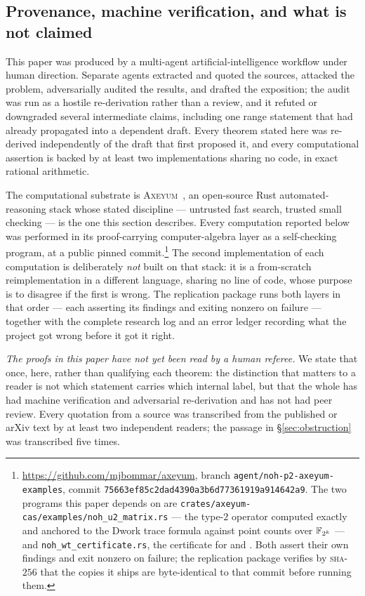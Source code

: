\subsection{Provenance, machine verification, and what is not claimed}
\label{sec:provenance}

This paper was produced by a multi-agent artificial-intelligence workflow
under human direction. Separate agents extracted and quoted the sources,
attacked the problem, adversarially audited the results, and drafted the
exposition; the audit was run as a hostile re-derivation rather than a
review, and it refuted or downgraded several intermediate claims, including
one range statement that had already propagated into a dependent draft. Every
theorem stated here was re-derived independently of the draft that first
proposed it, and every computational assertion is backed by at least two
implementations sharing no code, in exact rational arithmetic.

The computational substrate is \textsc{Axeyum}~\cite{axeyum2026}, an
open-source Rust automated-reasoning stack whose stated discipline ---
untrusted fast search, trusted small checking --- is the one this section
describes. Every computation reported below was performed in its
proof-carrying computer-algebra layer as a self-checking program, at a public
pinned commit.\footnote{\url{https://github.com/mjbommar/axeyum}, branch
\texttt{agent/noh-p2-axeyum-examples}, commit
\texttt{75663ef85c2dad4390a3b6d77361919a914642a9}. The two programs this
paper depends on are \texttt{crates/axeyum-cas/examples/noh\_u2\_matrix.rs}
--- the type-$2$ operator computed exactly and anchored to the Dwork trace
formula against point counts over $\mathbb{F}_{2^k}$ --- and
\texttt{noh\_wt\_certificate.rs}, the certificate for
 and
. Both assert their own findings and exit nonzero on failure;
the replication package verifies by \textsc{sha}-$256$ that the copies it
ships are byte-identical to that commit before running them.} The second
implementation of each computation is deliberately \emph{not} built on that
stack: it is a from-scratch reimplementation in a different language, sharing
no line of code, whose purpose is to disagree if the first is wrong. The
replication package runs both layers in that order --- each asserting its
findings and exiting nonzero on failure --- together with the complete
research log and an error ledger recording what the project got wrong before
it got it right.

\emph{The proofs in this paper have not yet been read by a human referee.}
We state that once, here, rather than qualifying each theorem: the
distinction that matters to a reader is not which statement carries which
internal label, but that the whole has had machine verification and
adversarial re-derivation and has not had peer review. Every quotation from
a source was transcribed from the published or arXiv text by at least two
independent readers; the passage in \S\ref{sec:obstruction} was transcribed
five times.

